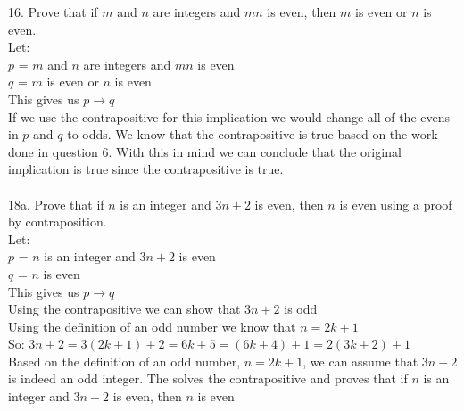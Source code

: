 \documentclass[11pt, oneside]{article}   	%
\begin{document}
16. Prove that if $m$ and $n$ are integers and $mn$ is even, then $m$ is even or $n$ is even. \\
Let: \\
$p$ = $m$ and $n$ are integers and $mn$ is even\\
$q$ = $m$ is even or $n$ is even\\
This gives us $p\to q$\\
If we use the contrapositive for this implication we would change all of the evens in $p$ and $q$ to odds. We know that the contrapositive is true based on the work done in question 6. With this in mind we can conclude that the original implication is true since the contrapositive is true. \\\\
18a. Prove that if $n$ is an integer and $3n + 2$ is even, then $n$ is even using a proof by contraposition.\\
Let: \\
$p$ =  $n$ is an integer and $3n + 2$ is even\\
$q$ = $n$ is even \\
This gives us $p\to q$\\
Using the contrapositive we can show that $3n + 2$ is odd\\
Using the definition of an odd number we know that $n = 2k +1$\\
So: $3n + 2 = 3(2k + 1) + 2 = 6k + 5 = (6k + 4) + 1 = 2(3k + 2) + 1$\\
Based on the definition of an odd number, $n = 2k +1$, we can assume that $3n + 2$ is indeed an odd integer. The solves the contrapositive and proves that if $n$ is an integer and $3n + 2$ is even, then $n$ is even 
\end{document}
